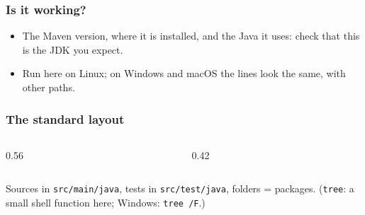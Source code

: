 \documentclass[aspectratio=169,10pt,compress]{beamer}
\begin{document}
\begin{frame}[t,fragile] \frametitle{Is it working?}

  \vspace{0.1em}
  \small
  \begin{itemize}
    \item The Maven version, where it is installed, and the Java it uses: check that this is the JDK you expect.
    \item Run here on Linux; on Windows and macOS the lines look the same, with other paths.
  \end{itemize}
\end{frame}





\begin{frame}[t,fragile] \frametitle{The standard layout}
  \begin{columns}[T]
    \begin{column}{0.56\textwidth}
    \end{column}
    \begin{column}{0.42\textwidth}
    \end{column}
  \end{columns}

  \vspace{0.1em}
  \small
  Sources in \texttt{src/main/java}, tests in \texttt{src/test/java}, folders = packages. (\texttt{tree}: a small shell function here; Windows: \texttt{tree /F}.)
\end{frame}
\end{document}
